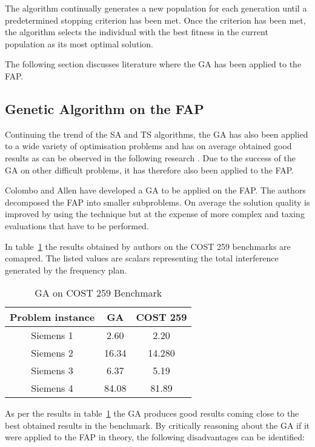 The algorithm continually generates a new population for each generation until a predetermined stopping criterion has been met. Once the criterion has been met, the algorithm selects the individual with the best fitness in the current population as its most optimal solution.

The following section discusses literature where the \gls{GA} has been applied to the \gls{FAP}.

\subsection{Genetic Algorithm on the \gls{FAP}}
Continuing the trend of the \gls{SA} and \gls{TS} algorithms, the \gls{GA} has also been applied to a wide variety of optimisation problems and has on average obtained good results as can be observed in the following research \cite{GANonConvex,SelfAdaptiveDataMiningGA,AutoComplexMeta}. Due to the success of the \gls{GA} on other difficult problems, it has therefore also been applied to the \gls{FAP}.

Colombo and Allen\cite{ProblemDecompMIFAP} have developed a \gls{GA} to be applied on the \gls{FAP}. The authors decomposed the \gls{FAP} into smaller subproblems. On average the solution quality is improved by using the technique but at the expense of more complex and taxing evaluations that have to be performed\cite{ProblemDecompMIFAP}. 

In table~\ref{tab:GA} the results obtained by authors on the \gls{COST} 259 benchmarks are comapred. The listed values are scalars representing the total interference generated by the frequency plan.
\begin{table}[H]
\centering
	\begin{tabular}{| c | c | c |}
	\hline
	Problem instance & \gls{GA} & \gls{COST} 259 \\ \hline
	Siemens 1 & 2.60 & 2.20 \\ \hline
	Siemens 2 & 16.34 & 14.280 \\ \hline
	Siemens 3 & 6.37 & 5.19 \\ \hline
	Siemens 4 & 84.08 & 81.89 \\ \hline
	\end{tabular}
\caption{GA on \gls{COST} 259 Benchmark}
\label{tab:GA}
\end{table}

As per the results in table~\ref{tab:GA} the \gls{GA} produces good results coming close to the best obtained results in the benchmark. By critically reasoning about the \gls{GA} if it were applied to the \gls{FAP} in theory, the following disadvantages can be identified:

